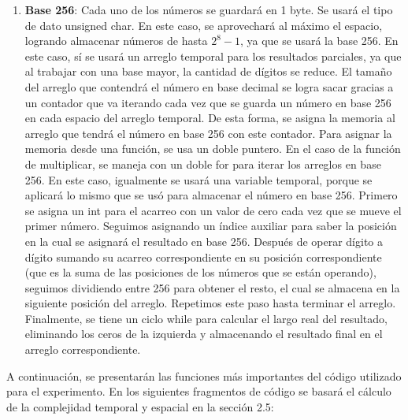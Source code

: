 \documentclass[10pt]{article}
\begin{document}
\begin{enumerate}
    \item \textbf{Base 256}: Cada uno de los números se guardará en 1 byte. Se usará el tipo de dato unsigned char. En este caso, se aprovechará al máximo el espacio, logrando almacenar números de hasta $2^8 - 1$, ya que se usará la base 256. En este caso, sí se usará un arreglo temporal para los resultados parciales, ya que al trabajar con una base mayor, la cantidad de dígitos se reduce. El tamaño del arreglo que contendrá el número en base decimal se logra sacar gracias a un contador que va iterando cada vez que se guarda un número en base 256 en cada espacio del arreglo temporal. De esta forma, se asigna la memoria al arreglo que tendrá el número en base 256 con este contador. Para asignar la memoria desde una función, se usa un doble puntero.
    En el caso de la función de multiplicar, se maneja con un doble for para iterar los arreglos en base 256. En este caso, igualmente se usará una variable temporal, porque se aplicará lo mismo que se usó para almacenar el número en base 256. Primero se asigna un int para el acarreo con un valor de cero cada vez que se mueve el primer número. Seguimos asignando un índice auxiliar para saber la posición en la cual se asignará el resultado en base 256. Después de operar dígito a dígito sumando su acarreo correspondiente en su posición correspondiente (que es la suma de las posiciones de los números que se están operando), seguimos dividiendo entre 256 para obtener el resto, el cual se almacena en la siguiente posición del arreglo. Repetimos este paso hasta terminar el arreglo. Finalmente, se tiene un ciclo while para calcular el largo real del resultado, eliminando los ceros de la izquierda y almacenando el resultado final en el arreglo correspondiente.
\end{enumerate}

A continuación, se presentarán las funciones más importantes del código utilizado para el experimento. En los siguientes fragmentos de código se basará el cálculo de la complejidad temporal y espacial en la sección 2.5:

\end{document}
